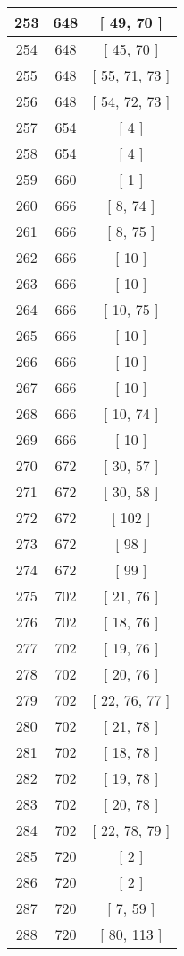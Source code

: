\begin{center}
\begin{longtable}[H]{|| c c c ||}
253 & 648 & [ 49, 70 ] \\ 
\hline
254 & 648 & [ 45, 70 ] \\ 
\hline
255 & 648 & [ 55, 71, 73 ] \\ 
\hline
256 & 648 & [ 54, 72, 73 ] \\ 
\hline
257 & 654 & [ 4 ] \\ 
\hline
258 & 654 & [ 4 ] \\ 
\hline
259 & 660 & [ 1 ] \\ 
\hline
260 & 666 & [ 8, 74 ] \\ 
\hline
261 & 666 & [ 8, 75 ] \\ 
\hline
262 & 666 & [ 10 ] \\ 
\hline
263 & 666 & [ 10 ] \\ 
\hline
264 & 666 & [ 10, 75 ] \\ 
\hline
265 & 666 & [ 10 ] \\ 
\hline
266 & 666 & [ 10 ] \\ 
\hline
267 & 666 & [ 10 ] \\ 
\hline
268 & 666 & [ 10, 74 ] \\ 
\hline
269 & 666 & [ 10 ] \\ 
\hline
270 & 672 & [ 30, 57 ] \\ 
\hline
271 & 672 & [ 30, 58 ] \\ 
\hline
272 & 672 & [ 102 ] \\ 
\hline
273 & 672 & [ 98 ] \\ 
\hline
274 & 672 & [ 99 ] \\ 
\hline
275 & 702 & [ 21, 76 ] \\ 
\hline
276 & 702 & [ 18, 76 ] \\ 
\hline
277 & 702 & [ 19, 76 ] \\ 
\hline
278 & 702 & [ 20, 76 ] \\ 
\hline
279 & 702 & [ 22, 76, 77 ] \\ 
\hline
280 & 702 & [ 21, 78 ] \\ 
\hline
281 & 702 & [ 18, 78 ] \\ 
\hline
282 & 702 & [ 19, 78 ] \\ 
\hline
283 & 702 & [ 20, 78 ] \\ 
\hline
284 & 702 & [ 22, 78, 79 ] \\ 
\hline
285 & 720 & [ 2 ] \\ 
\hline
286 & 720 & [ 2 ] \\ 
\hline
287 & 720 & [ 7, 59 ] \\ 
\hline
288 & 720 & [ 80, 113 ] \\ 

\end{longtable}
\end{center}
